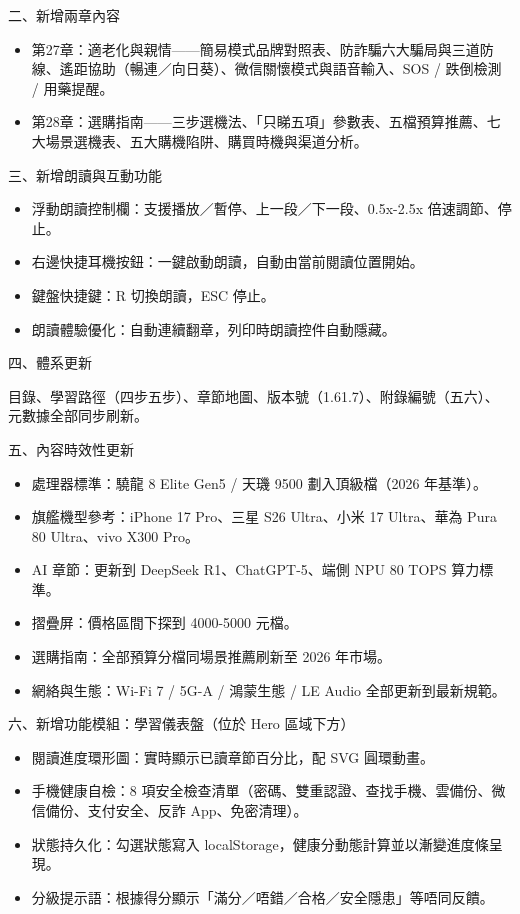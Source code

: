 二、新增兩章內容

\begin{itemize}
  \item 第27章：適老化與親情——簡易模式品牌對照表、防詐騙六大騙局與三道防線、遙距協助（暢連／向日葵）、微信關懷模式與語音輸入、SOS / 跌倒檢測 / 用藥提醒。
  \item 第28章：選購指南——三步選機法、「只睇五項」參數表、五檔預算推薦、七大場景選機表、五大購機陷阱、購買時機與渠道分析。
\end{itemize}

三、新增朗讀與互動功能

\begin{itemize}
  \item 浮動朗讀控制欄：支援播放／暫停、上一段／下一段、0.5x-2.5x 倍速調節、停止。
  \item 右邊快捷耳機按鈕：一鍵啟動朗讀，自動由當前閱讀位置開始。
  \item 鍵盤快捷鍵：R 切換朗讀，ESC 停止。
  \item 朗讀體驗優化：自動連續翻章，列印時朗讀控件自動隱藏。
\end{itemize}

四、體系更新

目錄、學習路徑（四步五步）、章節地圖、版本號（1.61.7）、附錄編號（五六）、元數據全部同步刷新。

五、內容時效性更新

\begin{itemize}
  \item 處理器標準：驍龍 8 Elite Gen5 / 天璣 9500 劃入頂級檔（2026 年基準）。
  \item 旗艦機型參考：iPhone 17 Pro、三星 S26 Ultra、小米 17 Ultra、華為 Pura 80 Ultra、vivo X300 Pro。
  \item AI 章節：更新到 DeepSeek R1、ChatGPT-5、端側 NPU 80 TOPS 算力標準。
  \item 摺疊屏：價格區間下探到 4000-5000 元檔。
  \item 選購指南：全部預算分檔同場景推薦刷新至 2026 年市場。
  \item 網絡與生態：Wi-Fi 7 / 5G-A / 鴻蒙生態 / LE Audio 全部更新到最新規範。
\end{itemize}

六、新增功能模組：學習儀表盤（位於 Hero 區域下方）

\begin{itemize}
  \item 閱讀進度環形圖：實時顯示已讀章節百分比，配 SVG 圓環動畫。
  \item 手機健康自檢：8 項安全檢查清單（密碼、雙重認證、查找手機、雲備份、微信備份、支付安全、反詐 App、免密清理）。
  \item 狀態持久化：勾選狀態寫入 localStorage，健康分動態計算並以漸變進度條呈現。
  \item 分級提示語：根據得分顯示「滿分／唔錯／合格／安全隱患」等唔同反饋。
\end{itemize}

